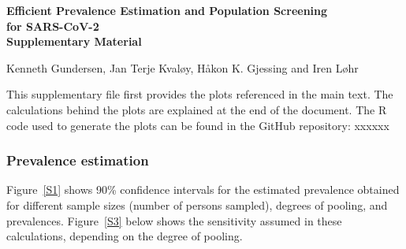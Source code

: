 \documentclass[10pt]{article}
\begin{document}
\begin{center}
{\large \bf  Efficient Prevalence Estimation and Population Screening\\ for SARS-CoV-2\\\vspace*{0.5cm} Supplementary Material  }                           
\end{center}

Kenneth Gundersen, Jan Terje Kvaløy, Håkon K. Gjessing and Iren Løhr

\vspace*{10mm}

This supplementary file first provides the plots referenced in the main text. The calculations behind the plots are explained at the end of the document. The R code used to generate the plots can be found in the GitHub repository: xxxxxx    

\subsubsection*{Prevalence estimation}

Figure~\ref{S1} shows 90\% confidence intervals for the estimated prevalence obtained for different sample sizes (number of persons sampled), degrees of pooling, and prevalences. Figure~\ref{S3} below shows the sensitivity assumed in these calculations, depending on the degree of pooling.
 
\end{document}
